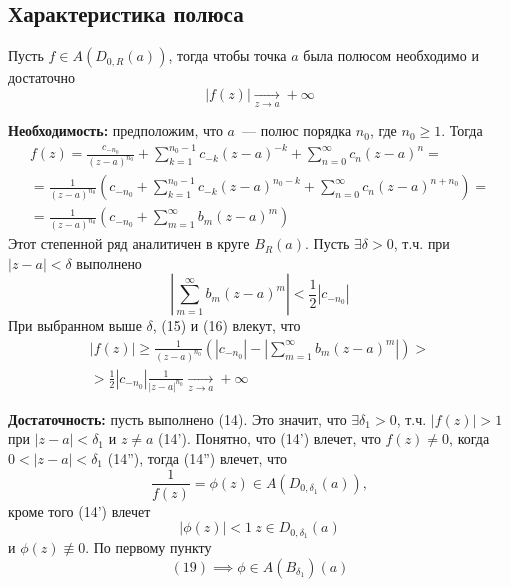 \documentclass[main]{subfiles}
\begin{document}
\subsection{Характеристика полюса}
\begin{theorem}
    Пусть $f \in A(D_{0, R} (a))$, тогда чтобы точка $a$ была полюсом необходимо и достаточно
    \[|f(z)| \xrightarrow[z \to a]{} + \infty \tag{14}\]
\end{theorem}
\begin{longProof}
    \textbf{Необходимость:} предположим, что $a$~--- полюс порядка $n_0$, где $n_0 \ge 1$.
    Тогда
    \begin{multline*}
        f(z) = \frac{c_{-n_0}}{(z-a)^{n_0}} + \sum_{k=1}^{n_0 - 1} c_{-k} (z-a)^{-k} + \sum_{n=0}^{\infty} c_{n} (z-a)^n = \\
        = \frac{1}{(z-a)^{n_0}}\left( c_{-n_0} + \sum_{k=1}^{n_0 -1} c_{-k}(z-a)^{n_0 - k} + \sum_{n=0}^{\infty} c_n (z-a)^{n+n_0}\right) = \\
        = \frac{1}{(z-a)^{n_0}}\left( c_{-n_0} + \sum_{m=1}^{\infty} b_m(z-a)^{m}\right) \tag{15}
    \end{multline*}
    Этот степенной ряд аналитичен в круге $B_R(a)$.
    Пусть $\exists \delta > 0$, т.ч. при $|z-a| < \delta$ выполнено
    \[\left| \sum_{m=1}^{\infty} b_m(z-a)^{m} \right| < \frac{1}{2} |c_{-n_0}| \tag{16}\]
    При выбранном выше $\delta$, (15) и (16) влекут, что
    \begin{multline*}
        |f(z)| \ge \frac{1}{(z-a)^{n_0}} \left( |c_{-n_0}| - \left| \sum_{m=1}^{\infty} b_m(z-a)^{m} \right|\right) > \\
        > \frac{1}{2} |c_{-n_0}| \frac{1}{|z-a|^{n_0}} \xrightarrow[z \to a]{} +\infty
    \end{multline*}

    \textbf{Достаточность:} пусть выполнено (14).
    Это значит, что $\exists \delta_1 > 0$, т.ч. $|f(z)| > 1$ при $|z - a| < \delta_1$ и $z \neq a$ (14').
    Понятно, что (14') влечет, что $f(z) \neq 0$, когда $0 < |z - a| < \delta_1$ (14''), тогда (14'') влечет, что
    \[\frac{1}{f(z)} = \phi(z) \in A(D_{0, \delta_1}(a)) \tag{18},\]
    кроме того (14') влечет
    \[|\phi(z)| < 1\ z \in D_{0, \delta_1}(a) \tag{19}\]
    и $\phi(z) \not\equiv 0$.
    По первому пункту
    \[(19) \implies \phi \in A(B_{\delta_1})(a) \tag{2}\]


\end{longProof}
\end{document}
